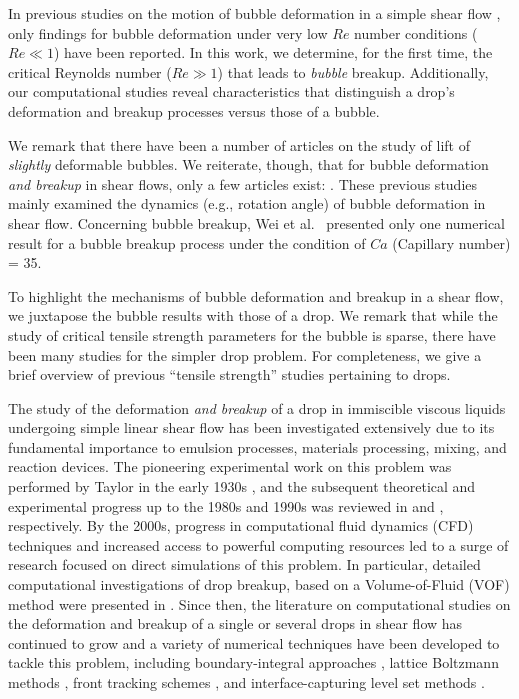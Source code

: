 \documentclass[review]{elsarticle}
\begin{document}
In previous studies on the motion of bubble deformation in a simple shear flow \cite{RusMan02, MulTobDreFisWin08}, only findings for bubble deformation under very low $Re$ number conditions ($Re \ll 1$) have been reported.  In this work, we determine, for the first time, the critical Reynolds number ($Re \gg 1$) that leads to \emph{bubble} breakup.  Additionally, our computational studies reveal characteristics that distinguish a drop's deformation and breakup processes versus those of a bubble.

We remark that there have been a number of articles on the study of lift of {\em slightly} deformable bubbles\cite{ErvinANDTryggvason1997,legendre1998lift}.  We reiterate, though, that for bubble deformation {\em and breakup} in shear flows, only a few articles exist: \cite{WeiQiaXu12,WanShiZha15}.  These previous studies mainly examined the dynamics (e.g., rotation angle) of bubble deformation in shear flow.  Concerning bubble breakup, Wei et al.~\cite{WeiQiaXu12} presented only one numerical result for a bubble breakup process under the condition of $Ca$ (Capillary number) = 35.  

To highlight the mechanisms of bubble deformation and breakup in a shear flow, we juxtapose the bubble results with those of a drop. We remark that while the study of critical tensile strength parameters for the bubble is sparse, there have been many studies for the simpler drop problem. For completeness, we give a brief overview of previous ``tensile strength'' studies pertaining to drops.

The study of the deformation {\em and breakup} of a drop in immiscible viscous liquids undergoing simple linear shear flow has been investigated extensively due to its fundamental importance to emulsion processes, materials processing, mixing, and reaction devices. The pioneering experimental work on this problem was performed by Taylor in the early 1930s \cite{Tay32, Tay34}, and the subsequent theoretical and experimental progress up to the 1980s and 1990s was reviewed in \cite{Ral84} and \cite{Sto94}, respectively.  By the 2000s, progress in computational fluid dynamics (CFD) techniques and increased access to powerful computing resources led to a surge of research focused on direct simulations of this problem.  In particular, detailed computational investigations of drop breakup, based on a Volume-of-Fluid (VOF) method \cite{HirNic81} were presented in \cite{LiRenRen00, RenCri01-1, RenCri01-2, RenCriLi02,KhiRenCri03,Ren06,Ren07,Ren08-2}.  Since then, the literature on computational studies on the deformation and breakup of a single or several drops in shear flow has continued to grow \cite{CriGuiAlfBlaLoe03, InaTomOgi03,ZhaMikBan06, BazAndMei06, JanAnd08, CroGriSch10,KomShaEskDer14,KomShaEskDer15, IoaLiuZha16, HerRan17,AmaBalCasOli19, ZhaShuGuaYan21} and a variety of numerical techniques have been developed to tackle this problem, including boundary-integral approaches \cite{CriBlaLoe01, JanAnd07}, lattice Boltzmann methods \cite{Ina06, KomShaEskDer14}, front tracking schemes \cite{UnvTry92}, and interface-capturing level set methods \cite{SusSmeOsh94}.
\end{document}
